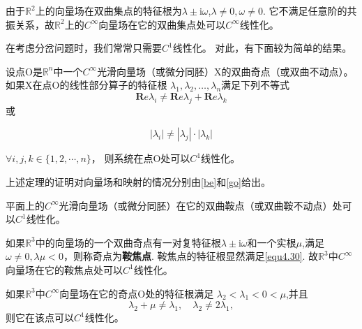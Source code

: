 \begin{example}
  由于\(\mathbb{R}^2\)上的向量场在双曲集点的特征根为$\lambda \pm \mathrm { i } \omega$,\(\lambda \neq 0,\omega \neq 0\).
  它不满足任意阶的共振关系，故\(\mathbb{R}^2\)上的\(C^\infty\)向量场在它的双曲集点处可以\(C^\infty\)线性化。  
\end{example}
在考虑分岔问题时，我们常常只需要\(C^1\)线性化。
对此，有下面较为简单的结果。

\begin{theorem}
  设点O是\(\mathbb{R}^n\)中一个\(C^\infty\)光滑向量场（或微分同胚）X的双曲奇点（或双曲不动点）。
  如果X在点O的线性部分算子的特征根
  $\lambda_{ 1 } , \lambda_{ 2 } , \dots , \lambda_{ n }$满足下列不等式
  \begin{equation}
    \mathbf{ R } e \lambda_{ i } \neq \mathbf{ R } e \lambda _ { j } + \mathbf{ R } e \lambda _ { k }
  \end{equation}或

  \begin{equation}
    \left| \lambda _ { i } \right| \neq \left| \lambda _ { j } \right| \cdot \left| \lambda_ { k } \right|
    \label{eq:1.4.30}
  \end{equation}
  
  $\forall i , j , k \in \{ 1,2 , \cdots , n \}$，
  则系统在点O处可以\(C^1\)线性化。
\end{theorem}


上述定理的证明对向量场和映射的情况分别由\ref{be}和\ref{go}给出。

\begin{example}
平面上的\(C^\infty\)光滑向量场（或微分同胚）在它的双曲鞍点（或双曲鞍不动点）处可以\(C^1\)线性化。
\end{example}

\begin{example}
  如果\(\mathbb{R}^3\)中的向量场的一个双曲奇点有一对复特征根$\lambda \pm \mathrm { i } \omega$和一个实根\(\mu\),满足$\omega \neq 0 , \lambda \mu < 0$，则称奇点为\textbf{鞍焦点}.
  鞍焦点的特征根显然满足\ref{equ4.30}.
  故\(\mathbb{R}^3\)中\(C^\infty\)向量场在它的鞍焦点处可以\(C^1\)线性化。
\end{example}
\begin{example}
如果\(\mathbb{R}^3\)中\(C^\infty\)向量场在它的奇点O处的特征根满足
$ { \lambda } _ { 2 } < \lambda _ { 1 } < 0 < \mu$,并且
\[
\lambda _ { 2 } + \mu \neq \lambda _ { 1 } , \quad \lambda _ { 2 } \neq 2 \lambda _ { 1 },
\]
则它在该点可以\(C^1\)线性化。
\end{example}

